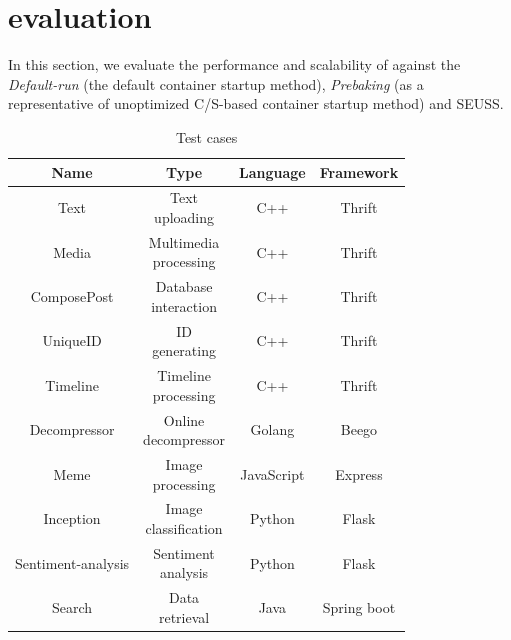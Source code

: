 \section{evaluation}

In this section, we evaluate the performance and scalability
of \pname against the \textit{Default-run}
(the default container startup method), \textit{Prebaking}\cite{prebaking}
(as a representative of unoptimized C/S-based container startup method)
and SEUSS\cite{seuss}.

\begin{table}
    \centering
    \caption{Test cases}
    \begin{tabular}{cccc}
        \hline
        Name               & Type                    & Language & Framework \\ \hline
        Text               & \makecell[c]{Text                              \\uploading}        & C++        & Thrift      \\
        Media              & \makecell[c]{Multimedia                        \\processing} & C++        & Thrift      \\
        ComposePost        & \makecell[c]{Database                          \\interaction}  & C++        & Thrift      \\
        UniqueID           & \makecell[c]{ID                                \\generating}         & C++        & Thrift      \\
        Timeline           & \makecell[c]{Timeline                          \\processing}   & C++        & Thrift      \\
        Decompressor       & \makecell[c]{Online                            \\decompressor}     & Golang     & Beego       \\
        Meme               & \makecell[c]{Image                             \\processing}        & JavaScript & Express     \\
        Inception          & \makecell[c]{Image                             \\classification}   & Python   & Flask       \\
        Sentiment-analysis & \makecell[c]{Sentiment                         \\analysis}      & Python   & Flask       \\
        Search             & \makecell[c]{Data                              \\retrieval}          & Java     & Spring boot \\ \hline
    \end{tabular}
    \label{table:test-case}
\end{table}

